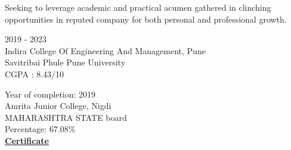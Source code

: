 \documentclass[letterpaper,10pt]{memoir} %
\begin{document}
\userinformation %

\framebreak %






{Seeking to leverage academic and practical acumen gathered in clinching opportunities in reputed company for both personal and professional growth.}\\





{2019 - 2023}\\
{Indira College Of Engineering And Management, Pune}\\
{Savitribai Phule Pune University}\\
CGPA : 8.43/10\\




{Year of completion: 2019}\\
{Amrita Junior College, Nigdi}\\
{MAHARASHTRA STATE board}\\
Percentage: 67.08\% \\
\textbf{\href{https://drive.google.com/file/d/1Y_d1f7XW1VYKLRC9zUc6Hj5_W-hmOaE0/view?usp=sharing}{Certificate}}\\
\end{document}
